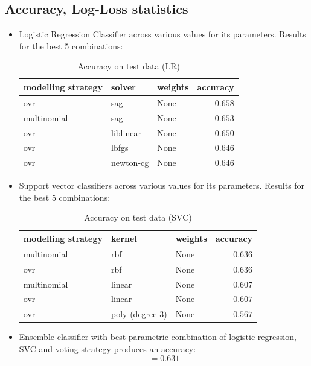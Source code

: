 \documentclass[fleqn,10pt]{SelfArx} %
\begin{document}
\subsection{Accuracy, Log-Loss statistics}
\begin{itemize}
	\item Logistic Regression Classifier across various values for its parameters. Results for the best 5 combinations:
	\begin{table}[H]
		\caption{Accuracy on test data (LR)}
		\centering
		\begin{tabular}{lllr}
			\toprule
			modelling strategy & solver & weights & accuracy\\ 
			\midrule
			ovr & sag & None & $0.658$ \\
			multinomial & sag & None & $0.653$ \\
			ovr & liblinear & None & $0.650$ \\
			ovr & lbfgs & None & $0.646$ \\
			ovr & newton-cg & None & $0.646$ \\
			\bottomrule
		\end{tabular}
		\label{tab:label}
	\end{table}
	\item Support vector classifiers across various values for its parameters. Results for the best 5 combinations:
	\begin{table}[H]
		\caption{Accuracy on test data (SVC)}
		\centering
		\begin{tabular}{lllr}
			\toprule
			modelling strategy & kernel & weights & accuracy\\ 
			\midrule
			multinomial & rbf & None & $0.636$ \\
			ovr & rbf & None & $0.636$ \\
			multinomial & linear & None & $0.607$ \\
			ovr & linear & None & $0.607$ \\
			ovr & poly (degree 3) & None & $0.567$ \\
			\bottomrule
		\end{tabular}
		\label{tab:label}
	\end{table}
	\item Ensemble classifier with best parametric combination of logistic regression, SVC and voting strategy produces an accuracy:
	$$=0.631$$

\end{itemize}
\end{document}
